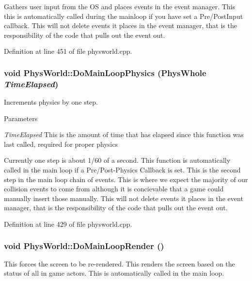 Gathers user input from the OS and places events in the event manager. This this is automatically called during the mainloop if you have set a Pre/PostInput callback. This will not delete events it places in the event manager, that is the responsibility of the code that pulls out the event out. 

Definition at line 451 of file physworld.cpp.\hypertarget{classPhysWorld_a4d8e06d2f8459a286eb01e68df2d1828}{
\subsubsection[{DoMainLoopPhysics}]{\setlength{\rightskip}{0pt plus 5cm}void PhysWorld::DoMainLoopPhysics (PhysWhole {\em TimeElapsed})}}
\label{db/df5/classPhysWorld_a4d8e06d2f8459a286eb01e68df2d1828}


Increments physics by one step. 
\begin{DoxyParams}{Parameters}
\item[{\em TimeElapsed}]This is the amount of time that has elapsed since this function was last called, required for proper physics\end{DoxyParams}
Currently one step is about 1/60 of a second. This function is automatically called in the main loop if a Pre/Post-\/Physics Callback is set. This is the second step in the main loop chain of events. This is where we expect the majority of our collision events to come from although it is concievable that a game could manually insert those manually. This will not delete events it places in the event manager, that is the responsibility of the code that pulls out the event out. 

Definition at line 429 of file physworld.cpp.\hypertarget{classPhysWorld_a8f33541d67164a2452e568443e9905be}{
\subsubsection[{DoMainLoopRender}]{\setlength{\rightskip}{0pt plus 5cm}void PhysWorld::DoMainLoopRender ()}}
\label{db/df5/classPhysWorld_a8f33541d67164a2452e568443e9905be}


This forces the screen to be re-\/rendered. This renders the screen based on the status of all in game actors. This is automatically called in the main loop. 

